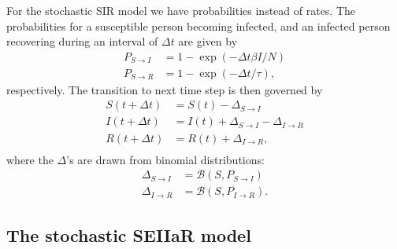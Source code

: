 For the stochastic SIR model we have probabilities instead of rates. The probabilities for a susceptible person becoming infected, and an infected person recovering during an interval of $\Delta t$ are given by
\begin{subequations}
	\begin{align}
		P_{S\to I} &= 1- \exp{(-\Delta t \beta I /N)} \\
		P_{S\to R} &= 1- \exp{(-\Delta t /\tau)},
	\end{align}
\end{subequations}
respectively. The transition to next time step is then governed by 
\begin{subequations}
	\begin{align}
		S(t + \Delta t) &= S(t) - \Delta_{S\to I} \\
		I(t + \Delta t) &= I(t) + \Delta_{S\to I} - \Delta_{I\to R} \\
		R(t + \Delta t) &= R(t) + \Delta_{I \to R}, \\
	\end{align}
\end{subequations}
where the $\Delta$'s are drawn from binomial distributions:
\begin{subequations}
	\begin{align*}
		\Delta_{S\to I } &= \mathcal{B}(S,P_{S \to I}) \\
		\Delta_{I\to R } &= \mathcal{B}(S,P_{I \to R}).
	\end{align*}
\end{subequations}

\subsection{The stochastic SEIIaR model}

